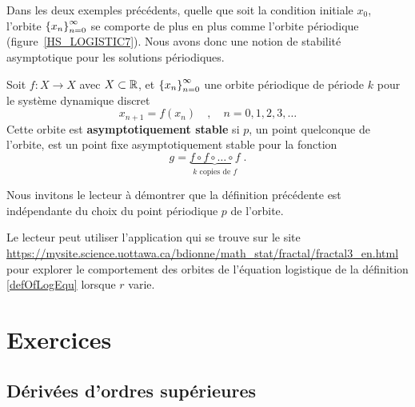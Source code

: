 {Dans les deux exemples précédents, quelle que soit la condition
initiale $x_0$, l'orbite
$\displaystyle \left\{ x_n\right\}_{n=0}^\infty$ se comporte de plus
en plus comme l'orbite périodique (figure~\ref{HS_LOGISTIC7}).  Nous
avons donc une notion de stabilité asymptotique pour les solutions
périodiques.


\begin{defn}
Soit $f: X \to X$ avec $X \subset \mathbb{R}$, et
$\displaystyle \left\{ x_n \right\}_{n=0}^\infty$ une orbite périodique
de période $k$ pour le système dynamique discret
\[
x_{n+1} = f(x_n) \quad , \quad n=0, 1, 2, 3, \ldots
\]
Cette orbite est {\bfseries asymptotiquement stable} si $p$, un point
quelconque de l'orbite, est un point fixe asymptotiquement stable pour
la fonction
\[
 g = \underbrace{f\circ f \circ \ldots \circ f}_{\text{$k$ copies de $f$}} \; .
\]
\end{defn}

\begin{rmk}
Nous invitons le lecteur à démontrer que la définition précédente est
indépendante du choix du point périodique $p$ de l'orbite.
\end{rmk}

Le lecteur peut utiliser l'application qui se trouve sur le site\\
\href{https://mysite.science.uottawa.ca/bdionne/math_stat/fractal/fractal3_en.html}{https://mysite.science.uottawa.ca/bdionne/math\_stat/fractal/fractal3\_en.html} pour explorer le comportement des
orbites de l'équation logistique de la définition \ref{defOfLogEqu}
lorsque $r$ varie.

}  %

\section{Exercices}

\subsection{Dérivées d'ordres supérieures}


